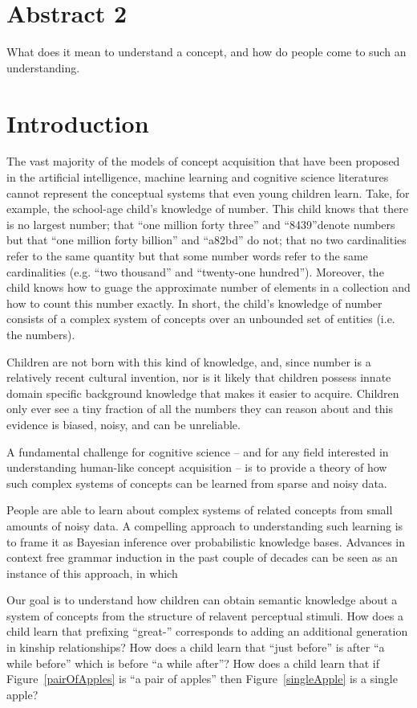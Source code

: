 \documentclass[11pt, twocolumn]{article}
\begin{document}
\section{Abstract 2}
What does it mean to understand a concept, and how do people come to
such an understanding.

\section{Introduction}
The vast majority of the models of concept acquisition that have been
proposed in the artificial intelligence, machine learning and
cognitive science literatures cannot represent the conceptual systems
that even young children learn. Take, for example, the school-age
child's knowledge of number. This child knows that there is no largest
number; that ``one million forty three'' and ``8439''denote numbers
but that ``one million forty billion'' and ``a82bd'' do not; that no
two cardinalities refer to the same quantity but that some number
words refer to the same cardinalities (e.g. ``two thousand'' and
``twenty-one hundred''). Moreover, the child knows how to guage the
approximate number of elements in a collection and how to count this
number exactly. In short, the child's knowledge of number consists of
a complex system of concepts over an unbounded set of entities
(i.e. the numbers). 

Children are not born with this kind of knowledge, and, since number
is a relatively recent cultural invention, nor is it likely that
children possess innate domain specific background knowledge that
makes it easier to acquire. Children only ever see a tiny fraction of
all the numbers they can reason about and this evidence is biased,
noisy, and can be unreliable. 

A fundamental challenge for cognitive science -- and for any field
interested in understanding human-like concept acquisition -- is to
provide a theory of how such complex systems of concepts can be
learned from sparse and noisy data.

People are able to learn about complex systems of related
concepts from small amounts of noisy data. A compelling approach to
understanding such learning is to frame it as Bayesian inference over
probabilistic knowledge bases. Advances in context free grammar
induction in the past couple of decades can be seen as an instance of
this approach, in which

Our goal is to understand how children can obtain semantic knowledge
about a system of concepts from the structure of relavent perceptual
stimuli. How does a child learn that prefixing ``great-'' corresponds
to adding an additional generation in kinship relationships? How does
a child learn that ``just before'' is after ``a while before'' which
is before ``a while after''? How does a child learn that if
Figure~\ref{pairOfApples} is ``a pair of apples'' then
Figure~\ref{singleApple} is a single apple? 
\end{document}
